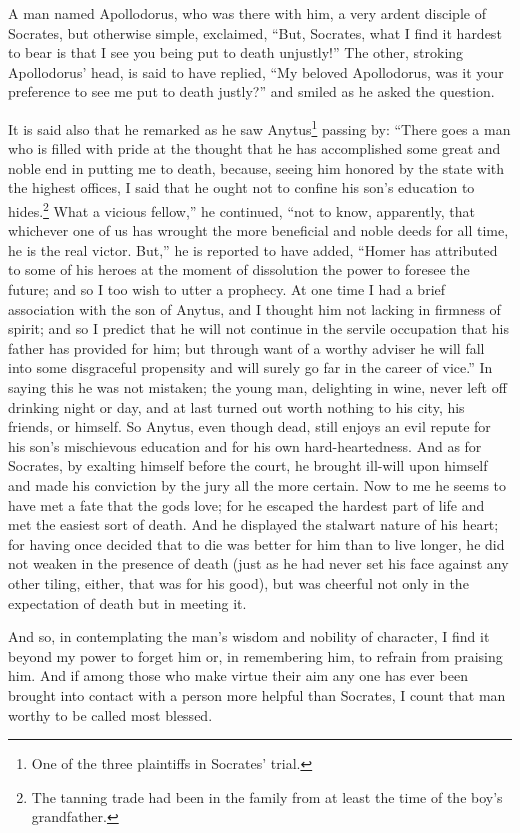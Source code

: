 \documentclass[12pt]{article}
\begin{document}
A man named Apollodorus, who was there with him, a very ardent disciple of
Socrates, but otherwise simple, exclaimed, ``But, Socrates, what I find it
hardest to bear is that I see you being put to death unjustly!'' The other,
stroking Apollodorus' head, is said to have replied, ``My beloved Apollodorus,
was it your preference to see me put to death justly?'' and smiled as he asked
the question.

It is said also that he remarked as he saw Anytus\footnote{One of the three
plaintiffs in Socrates' trial.} passing by: ``There goes a man who is filled
with pride at the thought that he has accomplished some great and noble end in
putting me to death, because, seeing him honored by the state with the highest
offices, I said that he ought not to confine his son's education to
hides.\footnote{The tanning trade had been in the family from at least the time
of the boy's grandfather.} What a vicious fellow,'' he continued, ``not to
know, apparently, that whichever one of us has wrought the more beneficial and
noble deeds for all time, he is the real victor. But,'' he is reported to have
added, ``Homer has attributed to some of his heroes at the moment of
dissolution the power to foresee the future; and so I too wish to utter a
prophecy. At one time I had a brief association with the son of Anytus, and I
thought him not lacking in firmness of spirit; and so I predict that he will
not continue in the servile occupation that his father has provided for him;
but through want of a worthy adviser he will fall into some disgraceful
propensity and will surely go far in the career of vice.'' In saying this he
was not mistaken; the young man, delighting in wine, never left off drinking
night or day, and at last turned out worth nothing to his city, his friends, or
himself. So Anytus, even though dead, still enjoys an evil repute for his son's
mischievous education and for his own hard-heartedness. And as for Socrates, by
exalting himself before the court, he brought ill-will upon himself and made
his conviction by the jury all the more certain. Now to me he seems to have met
a fate that the gods love; for he escaped the hardest part of life and met the
easiest sort of death. And he displayed the stalwart nature of his heart; for
having once decided that to die was better for him than to live longer, he did
not weaken in the presence of death (just as he had never set his face against
any other tiling, either, that was for his good), but was cheerful not only in
the expectation of death but in meeting it.

And so, in contemplating the man's wisdom and nobility of character, I find it
beyond my power to forget him or, in remembering him, to refrain from praising
him. And if among those who make virtue their aim any one has ever been brought
into contact with a person more helpful than Socrates, I count that man worthy
to be called most blessed.
\end{document}

